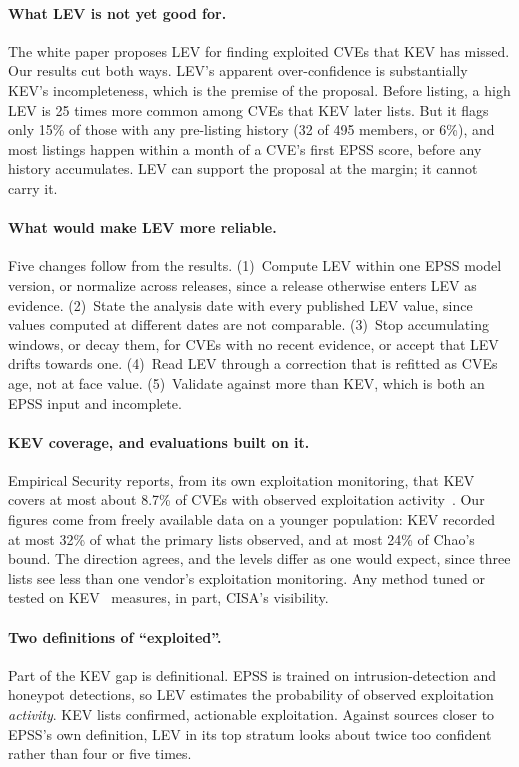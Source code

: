 \paragraph{What LEV is not yet good for.} The white paper proposes LEV for
finding exploited CVEs that KEV has missed. Our results cut both ways. LEV's
apparent over-confidence is substantially KEV's incompleteness, which is the
premise of the proposal. Before listing, a high LEV is 25 times more common
among CVEs that KEV later lists. But it flags only 15\% of those with any
pre-listing history (32 of 495 members, or 6\%), and most listings happen within a month of a CVE's first EPSS score, before any history
accumulates. LEV can support the proposal at the margin; it cannot carry it.

\paragraph{What would make LEV more reliable.} Five changes follow from the
results.
(1)~Compute LEV within one EPSS model version, or normalize across releases,
since a release otherwise enters LEV as evidence.
(2)~State the analysis date with every published LEV value, since values
computed at different dates are not comparable.
(3)~Stop accumulating windows, or decay them, for CVEs with no recent evidence,
or accept that LEV drifts towards one.
(4)~Read LEV through a correction that is refitted as CVEs age, not at face
value.
(5)~Validate against more than KEV, which is both an EPSS input and incomplete.

\paragraph{KEV coverage, and evaluations built on it.} Empirical Security
reports, from its own exploitation monitoring, that KEV covers at most about 8.7\% of CVEs
with observed exploitation activity~\cite{roytman2026kevparadox}. Our figures
come from freely available data on a younger population: KEV recorded at most 32\% of what
the primary lists observed, and at most 24\% of Chao's bound. The direction
agrees, and the levels differ as one would expect, since three lists see less
than one vendor's exploitation monitoring. Any method tuned or tested on
KEV~\cite{shimizu2026chaining,sherif2026kri,motamedi2026threatlens} measures,
in part, CISA's visibility.

\paragraph{Two definitions of ``exploited''.} Part of the KEV gap is
definitional. EPSS is trained on intrusion-detection and honeypot detections,
so LEV estimates the probability of observed exploitation \emph{activity}. KEV
lists confirmed, actionable exploitation. Against sources closer to EPSS's own
definition, LEV in its top stratum looks about twice too confident rather than
four or five times.

